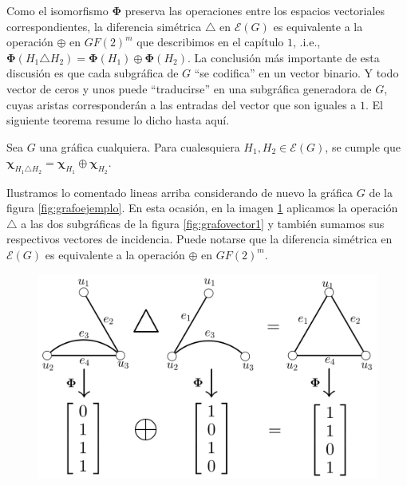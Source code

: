 Como el isomorfismo $\boldsymbol{\Phi}$ preserva las operaciones entre los espacios vectoriales correspondientes, la diferencia simétrica $\triangle$ en $\mathcal{E}(G)$ es equivalente a la operación $\oplus$ en $GF(2)^m$ que describimos en el capítulo $1$, .i.e., $\boldsymbol{\Phi}(H_{1} \triangle H_{2}) = \boldsymbol{\Phi}(H_{1}) \oplus \boldsymbol{\Phi}(H_{2})$. La conclusión más importante de esta discusión es que cada subgráfica de $G$ ``se codifica'' en un vector binario. Y todo vector de ceros y unos puede ``traducirse'' en una subgráfica generadora de $G$, cuyas aristas corresponderán a las entradas del vector que son iguales a $1$. El siguiente teorema resume lo dicho hasta aquí.


\begin{teo} \label{teo:xor}
Sea $G$ una gráfica cualquiera. Para cualesquiera $H_{1}, H_{2} \in \mathcal{E}(G)$, se cumple que $\boldsymbol{\chi}_{H_{1} \triangle H_{2}} = \boldsymbol{\chi}_{H_1} \oplus \boldsymbol{\chi}_{H_2}$.
\end{teo}


Ilustramos lo comentado lineas arriba considerando de nuevo la gráfica $G$ de la figura \ref{fig:grafoejemplo}. En esta ocasión, en la imagen \ref{fig:operacionesisomorfismo} aplicamos la operación $\triangle$ a las dos subgráficas de la figura \ref{fig:grafovector1} y también sumamos sus respectivos vectores de incidencia. Puede notarse que la diferencia simétrica en $\mathcal{E}(G)$ es equivalente a la operación $\oplus$ en $GF(2)^m$. 

\begin{figure}[H]
    \centering
    \includegraphics[scale=0.2]{img/imgchapter3/operacionesisomorfismo.jpg}
    \caption{}
    \label{fig:operacionesisomorfismo}
\end{figure}

